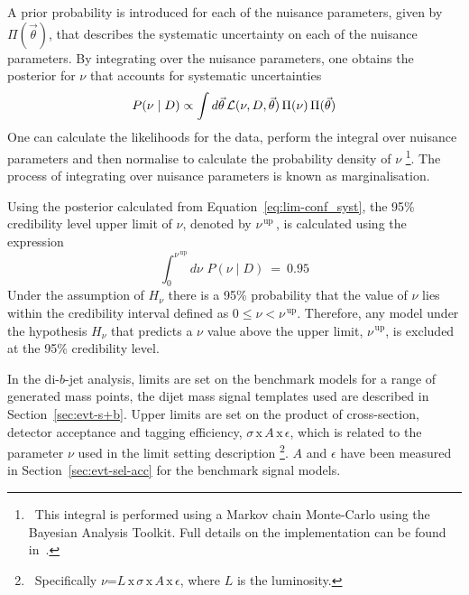 \newpage
A prior probability is introduced for each of the nuisance parameters, given by $\Pi(\vec{\theta})$,
that describes the systematic uncertainty on each of the nuisance parameters.
By integrating over the nuisance parameters,
one obtains the posterior for $\nu$ that accounts for systematic uncertainties
\begin{equation}
  P(\nu \mid D) \propto \int d \vec{\theta} \, \mathcal{L} (\nu, D, \vec{\theta} ) \, \Pi( \nu )  \, \Pi(\vec{\theta})
  \label{eq:lim-conf_syst}
\end{equation}
One can calculate the likelihoods for the data,
perform the integral over nuisance parameters
and then normalise to calculate the probability density of $\nu$
\footnote{\ This integral is performed using a Markov chain Monte-Carlo using the Bayesian Analysis Toolkit.
  Full details on the implementation can be found in~\cite{det-thesis_kate}.}.
The process of integrating over nuisance parameters is known as marginalisation.

Using the posterior calculated from Equation~\ref{eq:lim-conf_syst},
the 95\% credibility level upper limit of $\nu$, denoted by $\nu^{\,\text{up}}\,$,
is calculated using the expression
\begin{equation}
\int_0^{\nu^{\,\text{up}}} d \nu \, \, P(\nu \mid D)~=~0.95
\end{equation}
Under the assumption of $H_{\nu}$ there is a 95\% probability that the value of $\nu$ lies
within the credibility interval defined as \mbox{$0 \leq \nu < \nu^{\,\text{up}}$}.
Therefore, any model under the hypothesis $H_{\nu}$ that predicts a $\nu$
value above the upper limit, $\nu^{\,\text{up}}$, is excluded at the 95\% credibility level.

In the di-$b$-jet analysis, limits are set on the benchmark models for a range of generated mass points,
the dijet mass signal templates used are described in Section~\ref{sec:evt-s+b}.
Upper limits are set on the product of cross-section, detector acceptance and tagging efficiency,
$\sigma\,\text{x}\,\mathit{A}\,\text{x}\,\epsilon$,
which is related to the parameter $\nu$ used in the limit setting description
\footnote{\ 
  Specifically $\nu$=$L\,\text{x}\,\sigma\,\text{x}\,\mathit{A}\,\text{x}\,\epsilon$, where $L$ is the luminosity.
}.
$\mathit{A}$ and $\epsilon$ have been measured in Section~\ref{sec:evt-sel-acc} for the benchmark signal models.



